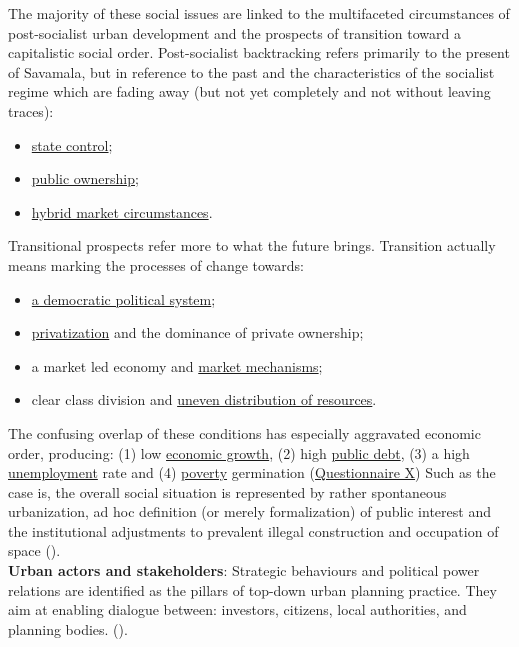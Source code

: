 \documentclass[11pt]{report}
\begin{document}
\begin{itemize}
The majority of these social issues are linked to the multifaceted circumstances of post-socialist urban development and the prospects of transition toward a capitalistic social order. Post-socialist backtracking refers primarily to the present of Savamala, but in reference to the past and the characteristics of the socialist regime which are fading away (but not yet completely and not without leaving traces):

\begin{itemize}
\item \underline{state control};
\item \underline{public ownership};
\item \underline{hybrid market circumstances}.
\end{itemize}

Transitional prospects refer more to what the future brings. Transition actually means marking the processes of change towards:

\begin{itemize}
\item \underline{a democratic political system};
\item \underline{privatization} and the dominance of private ownership;
\item a market led economy and \underline{market mechanisms};
\item clear class division and \underline{uneven distribution of resources}.
\end{itemize}

The confusing overlap of these conditions has especially aggravated economic order, producing:
(1) low \underline{economic growth},
(2) high \underline{public debt},
(3) a high \underline{unemployment} rate
and
(4) \underline{poverty} germination (\href{Questionnaire Experts Post-socialist}{Questionnaire X})
Such as the case is, the overall social situation is represented by rather spontaneous urbanization, ad hoc definition (or merely formalization) of public interest and the institutional adjustments to prevalent illegal construction and occupation of space (\href{ref}{\citealt{ministarstvo_prostora_urbani_2014}}).
\\

\textbf{Urban actors and stakeholders}:
Strategic behaviours and political power relations are identified as the pillars of top-down urban planning practice.
They aim at enabling dialogue between: investors, citizens, local authorities, and planning bodies.
(\href{Vujosevic}{\citealt{vujosevic_problem_2006}}).


\end{itemize}
\end{document}
